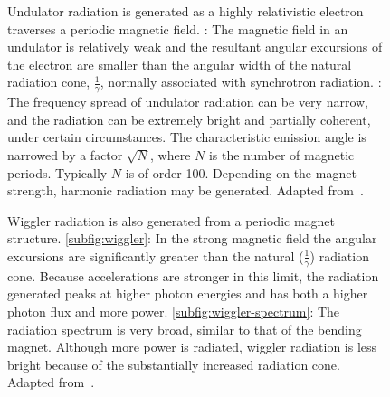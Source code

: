 \begin{figure}[htb]
	\noindent{}
	\caption[Undulator radiation]{Undulator radiation is generated as a highly relativistic electron traverses a periodic magnetic field.%
		: The magnetic field in an undulator is relatively weak and the resultant angular excursions of the electron are smaller than the angular width of the natural radiation cone, $\frac{1}{\gamma}$, normally associated with synchrotron radiation.%
		: The frequency spread of undulator radiation can be very narrow, and the radiation can be extremely bright and partially coherent, under certain circumstances. The characteristic emission angle is narrowed by a factor $\sqrt N$, where $N$ is the number of magnetic periods. Typically $N$ is of order 100. Depending on the magnet strength, harmonic radiation may be generated. Adapted from~\cite{Attwood2007}.}%
	\label{fig:undulator}
\end{figure}

\begin{figure}[htb]
	\noindent{}
	\caption[Wiggler radiation]{Wiggler radiation is also generated from a periodic magnet structure. %
		\ref{subfig:wiggler}: In the strong magnetic field the angular excursions are significantly greater than the natural ($\frac{1}{\gamma}$) radiation cone. Because accelerations are stronger in this limit, the radiation generated peaks at higher photon energies and has both a higher photon flux and more power. %
		\ref{subfig:wiggler-spectrum}: The radiation spectrum is very broad, similar to that of the bending magnet. Although more power is radiated, wiggler radiation is less bright because of the substantially increased radiation cone. Adapted from~\cite{Attwood2007}.}%
	\label{fig:wiggler}
\end{figure}

